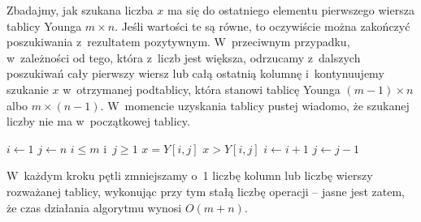 \subproblem %
Zbadajmy, jak szukana liczba $x$ ma się do ostatniego elementu pierwszego wiersza tablicy Younga $m\times n$. Jeśli wartości te są równe, to oczywiście można zakończyć poszukiwania z~rezultatem pozytywnym. W~przeciwnym przypadku, w~zależności od tego, która z~liczb jest większa, odrzucamy z~dalszych poszukiwań cały pierwszy wiersz lub całą ostatnią kolumnę i~kontynuujemy szukanie $x$ w~otrzymanej podtablicy, która stanowi tablicę Younga $(m-1)\times n$ albo $m\times(n-1)$. W~momencie uzyskania tablicy pustej wiadomo, że szukanej liczby nie ma w~początkowej tablicy.
\begin{codebox}
\li	$i\gets1$
\li	$j\gets n$
\li	\While $i\le m$ i~$j\ge1$
\li		\Do
			\If $x=Y[i,j]$
\li				\Then \Return {}
				\End
\li			\If $x>Y[i,j]$
\li				\Then $i\gets i+1$
\li				\Else $j\gets j-1$
				\End
		\End
\li	\Return {}
\end{codebox}

W~każdym kroku pętli  zmniejszamy o~1 liczbę kolumn lub liczbę wierszy rozważanej tablicy, wykonując przy tym stałą liczbę operacji -- jasne jest zatem, że czas działania algorytmu wynosi $O(m+n)$.

\endinput
